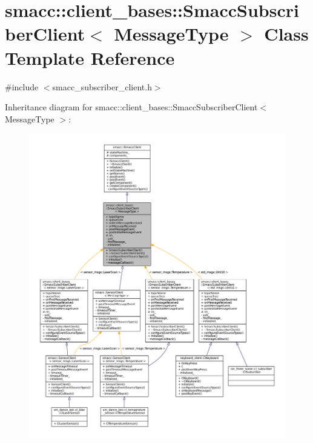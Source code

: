 \hypertarget{classsmacc_1_1client__bases_1_1SmaccSubscriberClient}{}\section{smacc\+:\+:client\+\_\+bases\+:\+:Smacc\+Subscriber\+Client$<$ Message\+Type $>$ Class Template Reference}
\label{classsmacc_1_1client__bases_1_1SmaccSubscriberClient}


{\ttfamily \#include $<$smacc\+\_\+subscriber\+\_\+client.\+h$>$}



Inheritance diagram for smacc\+:\+:client\+\_\+bases\+:\+:Smacc\+Subscriber\+Client$<$ Message\+Type $>$\+:
\nopagebreak
\begin{figure}[H]
\begin{center}
\leavevmode
\includegraphics[width=350pt]{classsmacc_1_1client__bases_1_1SmaccSubscriberClient__inherit__graph}
\end{center}
\end{figure}


